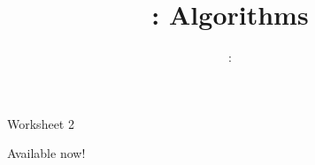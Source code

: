 \usepackage{../../beamerthemeFalmouthGamesAcademy}
\usepackage{multimedia}
\graphicspath{ {../../} }

\lstset{language=Python
}

\usepackage[normalem]{ulem}
\usepackage{wasysym}

\usepackage{pdfpages}

\usepackage{algpseudocode}

\usetikzlibrary{arrows,automata}



\hypersetup{
pdftex,
pdftitle=\sessionnumber: Algorithms,
pdfauthor=Ed Powley,
pdfdisplaydoctitle,
pdflang=en-GB
}
 

\title{\sessionnumber: Algorithms}
\subtitle{\modulecode: \moduletitle}

\frame{\titlepage} 

\begin{frame}{Worksheet 2}
    \begin{center}
        Available now!
    \end{center}
\end{frame}











